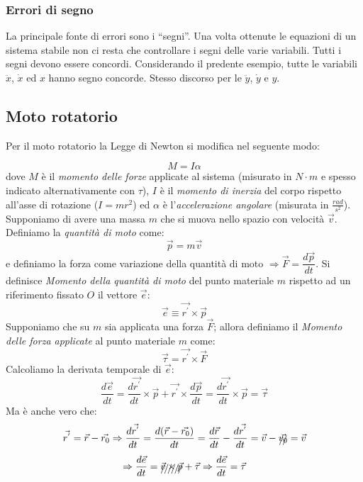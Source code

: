 \documentclass[a4paper]{report}
\begin{document}
\subsubsection{Errori di segno}
La principale fonte di errori sono i ``segni''. Una volta ottenute le
equazioni di un sistema stabile non ci resta che controllare i
segni delle varie variabili. Tutti i segni devono essere
concordi. Considerando il predente esempio, tutte le variabili
$\ddot{x}$, $\dot{x}$ ed $x$ hanno segno concorde. Stesso discorso per
le $\ddot{y}$, $\dot{y}$ e $y$.

\subsection{Moto rotatorio}
Per il moto rotatorio la Legge di Newton si modifica nel seguente modo:

\begin{equation}\label{momentodelleforze}
  M = I \alpha
\end{equation}
dove $M$ \`e il {\em momento delle forze} applicate al
sistema (misurato in $N \cdot m$ e spesso indicato alternativamente
con $\tau$), $I$ \`e il {\em momento di inerzia} del corpo rispetto all'asse di rotazione ($I = mr^2$) ed
$\alpha$ \`e l'{\em accelerazione
  angolare} (misurata in $\frac{rad}{s^2}$).
Supponiamo di avere una massa $m$ che si muova nello spazio con
velocit\`a $\vec{v}$. Definiamo la {\em quantit\`a di
  moto} come:
\begin{equation}
  \vec{p} = m \vec{v}
\end{equation}
e definiamo la forza come variazione della quantit\`a di moto
$\Rightarrow \vec{F} = \dfrac{d\vec{p}}{dt}$.
Si definisce {\em Momento della quantit\`a di moto} del punto materiale $m$ rispetto ad un
riferimento fissato $O$ il vettore $\vec{e}$:
\begin{equation}
  \vec{e} \equiv \vec{r^{'}} \times \vec{p}
\end{equation}
Supponiamo che su $m$ sia applicata una forza $\vec{F}$; allora
definiamo il {\em Momento delle forza applicate} al punto materiale $m$ come:
\begin{equation}
  \vec{\tau} = \vec{r^{'}} \times \vec{F}
\end{equation}
Calcoliamo la derivata temporale di $\vec{e}$:
$$\frac{d \vec{e}}{dt} = \frac{d \vec{r^{'}}}{dt} \times \vec{p} +
\vec{r^{'}} \times \frac{d \vec{p}}{dt} = \frac{d \vec{r^{'}}}{dt}
\times \vec{p} = \vec{\tau}$$
Ma \`e anche vero che:
$$\vec{r^{'}} = \vec{r} - \vec{r_0} \Rightarrow \frac{d
  \vec{r^{'}}}{dt} = \frac{d (\vec{r} - \vec{r_0})}{dt} =
\frac{d\vec{r}}{dt} - \frac{d \vec{r^{'}}}{dt} = \vec{v} -
\xout{\vec{v_0}} = \vec{v}$$
$$\Rightarrow \frac{d \vec{e}}{dt} = \xout{\vec{v} \times \vec{p}} +
\vec{\tau} \Rightarrow \frac{d \vec{e}}{dt} = \vec{\tau}$$
\end{document}
